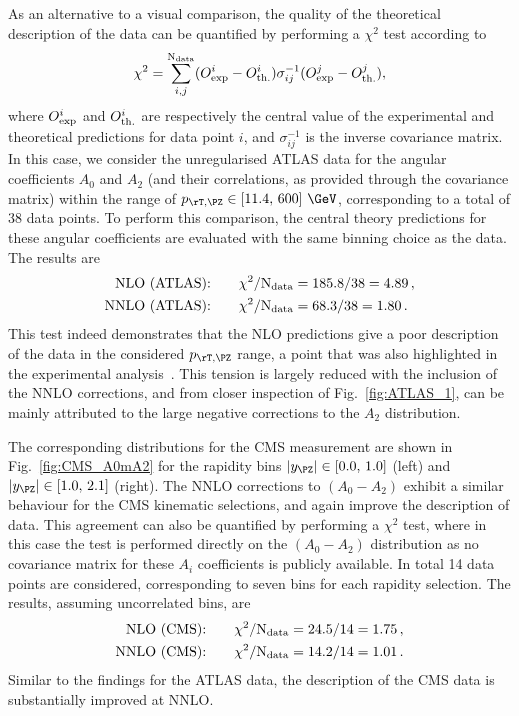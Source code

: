As an alternative to a visual comparison, the quality of the theoretical description of the data can be
quantified by performing a $\chi^2$ test according to
%
\begin{align}
\chi^2 = \sum_{i,j}^{\rm N_{data}} ( O_{\rm exp}^i - O_{\rm th.}^i ) \sigma_{ij}^{-1} ( O_{\rm exp}^j - O_{\rm th.}^j ) ,
\end{align}
%
where $O_{\rm exp}^i$ and $O_{\rm th.}^i$ are respectively the central value of the experimental and theoretical predictions
for data point $i$, and $\sigma_{ij}^{-1}$ is the inverse covariance matrix.
%
In this case, we consider the unregularised ATLAS data for the angular coefficients $A_0$ and $A_2$ (and their correlations, as provided through the covariance matrix) within the range of $\ptz \in [11.4,\,600]~\GeV$, corresponding to a total of 38 data points. To perform this comparison, the central theory predictions for these angular coefficients are evaluated with the same binning choice as the data.
%
The results are
% 
\begin{align} %
  \text{NLO  (ATLAS):}&\qquad \chi^2/{\rm N_{data}} = 185.8/38 = 4.89 \,, \nonumber \\
  \text{NNLO (ATLAS):}&\qquad \chi^2/{\rm N_{data}} = 68.3/38  = 1.80 \,. \nonumber
\end{align}
%
This test indeed demonstrates that the NLO predictions give a poor description of the
data in the considered $\ptz$ range, a point that was also highlighted in the experimental analysis~\cite{Aad:2016izn}. 
This tension is largely reduced with the inclusion of the NNLO corrections, and from closer inspection 
of Fig.~\ref{fig:ATLAS_1}, can be mainly attributed to the large negative corrections to the $A_2$ distribution.

The corresponding \ptz distributions for the CMS measurement are shown in Fig.~\ref{fig:CMS_A0mA2}
for the rapidity bins $\lvert\yz\rvert \in [0.0,\,1.0]$ (left) and $\lvert\yz\rvert \in [1.0,\,2.1]$ (right). 
%
The NNLO corrections to $(A_0-A_2)$ exhibit a similar behaviour for the CMS kinematic selections,
and again improve the description of data. This agreement can also be quantified by performing 
a $\chi^2$ test, where in this case the test is performed directly on the $(A_0-A_2)$ distribution 
as no covariance matrix for these $A_i$ coefficients is publicly available. In total 14 data points are considered, corresponding
to seven \ptz bins for each rapidity selection. The results, assuming uncorrelated bins, are
%
\begin{align} %
  \text{NLO  (CMS):}&\qquad \chi^2/{\rm N_{data}} = 24.5/14 = 1.75\,, \nonumber \\
  \text{NNLO (CMS):}&\qquad \chi^2/{\rm N_{data}} = 14.2/14 = 1.01 \,. \nonumber
\end{align}
%
Similar to the findings for the ATLAS data, the description of the CMS data is substantially improved at NNLO.

